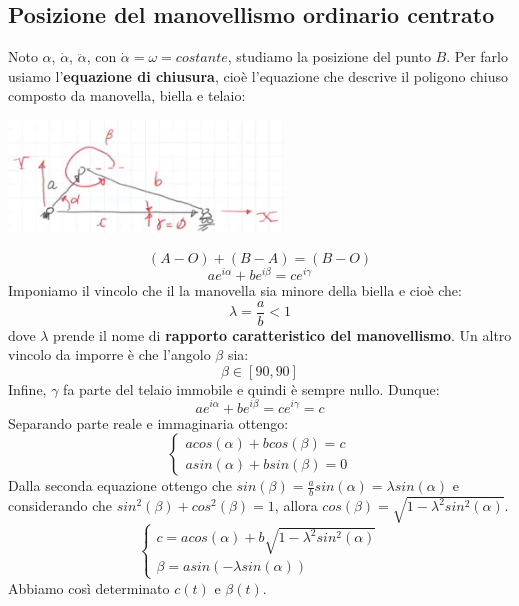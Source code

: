 \subsection{Posizione del manovellismo ordinario centrato}
Noto $\alpha$, $\dot{\alpha}$, $\ddot{\alpha}$, con $\dot{\alpha} = \omega = costante$, studiamo la posizione del punto $B$.\newline
\newline
Per farlo usiamo l'\textbf{equazione di chiusura}, cioè l'equazione che descrive il poligono chiuso composto da manovella, biella e telaio:
\begin{center}
    \includegraphics[height=3cm]{../lezione5/img2.JPG}
\end{center}
\[
    (A-O) + (B-A) = (B-O)
\]
\[
    a e^{i \alpha} + b e^{i \beta} = c e^{i \gamma}
\]
Imponiamo il vincolo che il la manovella sia minore della biella e cioè che:
\[
    \lambda = \frac{a}{b} < 1
\]
dove $\lambda$ prende il nome di \textbf{rapporto caratteristico del manovellismo}.\newline
Un altro vincolo da imporre è che l'angolo $\beta$ sia:
\[
    \beta \in [90, 90]
\]
Infine, $\gamma$ fa parte del telaio immobile e quindi è sempre nullo.\newline
\newline
Dunque:
\[
    a e^{i \alpha} + b e^{i \beta} = c e^{i \gamma} = c
\]
Separando parte reale e immaginaria ottengo:
\[
    \begin{cases}
        a cos(\alpha) + b cos(\beta) = c\\
        a sin(\alpha) + b sin(\beta) = 0
    \end{cases}
\]
Dalla seconda equazione ottengo che $sin(\beta) = \frac{a}{b} sin(\alpha) = \lambda sin( \alpha)$ e considerando che $sin^2(\beta) + cos^{2} (\beta) = 1$, allora $cos(\beta) = \sqrt{1-\lambda^2 sin^2(\alpha)}$.
\[
    \begin{cases}
        c = a cos(\alpha) + b \sqrt{1- \lambda^2 sin^2(\alpha)}\\
        \beta = a sin(-\lambda sin(\alpha))
    \end{cases}
\]
Abbiamo così determinato $c(t)$ e $\beta(t)$.\newline
